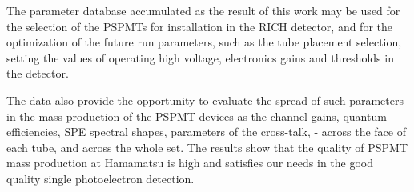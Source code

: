 The parameter database accumulated as the result of this work may be used for the selection of the PSPMTs for installation in the RICH detector, and for the optimization of the future run parameters, such as the tube placement selection, setting the values of operating high voltage, electronics gains and thresholds in the detector.


The data also provide the opportunity to evaluate the spread of such parameters in the mass production of the PSPMT devices as the channel gains, quantum efficiencies, SPE spectral shapes, parameters of the cross-talk, - across the face of each tube, and across the whole set. The results show that the quality of PSPMT mass production at Hamamatsu is high and satisfies our needs in the good quality single photoelectron detection.




